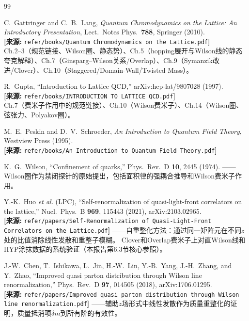 \documentclass[12pt,a4paper]{ctexart}
\theoremstyle{definition}
\begin{document}
\begin{thebibliography}{99}

C.~Gattringer and C.~B.~Lang,
\textit{Quantum Chromodynamics on the Lattice: An Introductory Presentation},
Lect.\ Notes Phys.\ \textbf{788}, Springer (2010).
\\\textbf{[来源:} \texttt{refer/books/Quantum Chromodynamics on the Lattice.pdf}\textbf{]}
\\Ch.2--3（规范链接、Wilson圈、静态势）、Ch.5（hopping展开与Wilson线的静态夸克解释）、Ch.7（Ginsparg--Wilson关系/Overlap）、Ch.9（Symanzik改进/Clover）、Ch.10（Staggered/Domain-Wall/Twisted Mass）。

R.~Gupta,
``Introduction to Lattice QCD,''
arXiv:hep-lat/9807028 (1997).
\\\textbf{[来源:} \texttt{refer/books/INTRODUCTION TO LATTICE QCD.pdf}\textbf{]}
\\Ch.7（费米子作用中的规范链接）、Ch.10（Wilson费米子）、Ch.14（Wilson圈、弦张力、Polyakov圈）。

M.~E.~Peskin and D.~V.~Schroeder,
\textit{An Introduction to Quantum Field Theory},
Westview Press (1995).
\\\textbf{[来源:} \texttt{refer/books/An Introduction to Quantum Field Theory.pdf}\textbf{]}

K.~G.~Wilson,
``Confinement of quarks,''
Phys.\ Rev.\ D \textbf{10}, 2445 (1974).
——Wilson圈作为禁闭探针的原始提出，包括面积律的强耦合推导和Wilson费米子作用。

Y.-K.~Huo \textit{et al.} (LPC),
``Self-renormalization of quasi-light-front correlators on the lattice,''
Nucl.\ Phys.\ B \textbf{969}, 115443 (2021), arXiv:2103.02965.
\\\textbf{[来源:} \texttt{refer/papers/Self-Renormalization of Quasi-Light-Front Correlators on the Lattice.pdf}\textbf{]}
——自重整化方法：通过同一矩阵元在不同$z$处的比值消除线性发散和重整子模糊。
Clover和Overlap费米子上对直Wilson线和HYP涂抹数据的系统验证（本报告第6.3节核心参照）。

J.-W.~Chen, T.~Ishikawa, L.~Jin, H.-W.~Lin, Y.-B.~Yang, J.-H.~Zhang, and Y.~Zhao,
``Improved quasi parton distribution through Wilson line renormalization,''
Phys.\ Rev.\ D \textbf{97}, 014505 (2018), arXiv:1706.01295.
\\\textbf{[来源:} \texttt{refer/papers/Improved quasi parton distribution through Wilson line renormalization.pdf}\textbf{]}
——辅助$z$场形式中线性发散作为质量重整化的证明，质量抵消项$\delta m$到所有阶的有效性。


\end{thebibliography}
\end{document}

